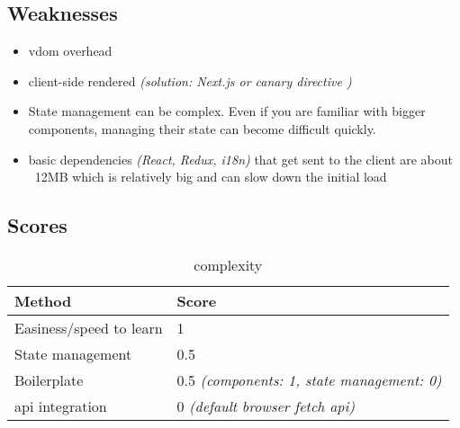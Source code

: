 \subsection{Weaknesses}
\label{subsec:react:weaknesses}
\begin{itemize}
    \item \acrshort{vdom} overhead
    \item client-side rendered \textit{(solution: Next.js or canary  directive \cite{react:use_server_directive})}
    \item State management can be complex. Even if you are familiar with bigger components, managing their state can become difficult quickly.
    \item basic dependencies \textit{(React, Redux, \acrshort{i18n})} that get sent to the client are about ~12MB which is relatively big and can slow down the initial load
\end{itemize}

\subsection{Scores}
\label{subsec:react:scores}

\begin{table}[H]
    \centering
    \begin{tabular}{|l|l|}
        \hline
        \textbf{Method}             & \textbf{Score} \\
        \hline
        Easiness/speed to learn     & 1                                                 \\ \hline
        State management            & 0.5                                               \\ \hline
        Boilerplate                 & 0.5 \textit{(components: 1, state management: 0)} \\ \hline
        \acrshort{api} integration  & 0 \textit{(default browser fetch \acrshort{api})} \\ \hline
    \end{tabular}
    \caption{complexity}
    \label{tab:react:complexity}
\end{table}


